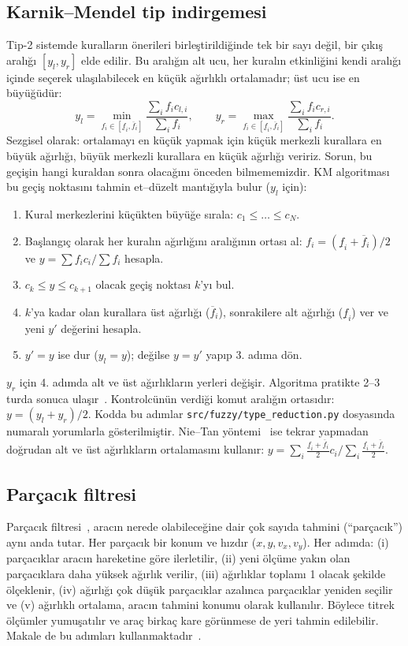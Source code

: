 \documentclass[conference,a4paper]{IEEEtran}
\begin{document}
\subsection{Karnik--Mendel tip indirgemesi}
Tip-2 sistemde kuralların önerileri birleştirildiğinde tek bir sayı değil, bir çıkış aralığı $[y_l, y_r]$ elde edilir. Bu aralığın alt ucu, her kuralın etkinliğini kendi aralığı içinde seçerek ulaşılabilecek en küçük ağırlıklı ortalamadır; üst ucu ise en büyüğüdür:
\begin{equation}
y_l=\min_{f_i\in[\underline{f}_i,\overline{f}_i]}\frac{\sum_i f_i c_{l,i}}{\sum_i f_i},\qquad
y_r=\max_{f_i\in[\underline{f}_i,\overline{f}_i]}\frac{\sum_i f_i c_{r,i}}{\sum_i f_i}.
\end{equation}
Sezgisel olarak: ortalamayı en küçük yapmak için küçük merkezli kurallara en büyük ağırlığı, büyük merkezli kurallara en küçük ağırlığı veririz. Sorun, bu geçişin hangi kuraldan sonra olacağını önceden bilmememizdir. KM algoritması~\cite{karnik2001} bu geçiş noktasını tahmin et--düzelt mantığıyla bulur ($y_l$ için):
\begin{enumerate}
\item Kural merkezlerini küçükten büyüğe sırala: $c_1\le\dots\le c_N$.
\item Başlangıç olarak her kuralın ağırlığını aralığının ortası al: $f_i=(\underline{f}_i+\overline{f}_i)/2$ ve $y=\sum f_i c_i/\sum f_i$ hesapla.
\item $c_k\le y\le c_{k+1}$ olacak geçiş noktası $k$'yı bul.
\item $k$'ya kadar olan kurallara üst ağırlığı ($\overline{f}_i$), sonrakilere alt ağırlığı ($\underline{f}_i$) ver ve yeni $y'$ değerini hesapla.
\item $y'=y$ ise dur ($y_l=y$); değilse $y=y'$ yapıp 3. adıma dön.
\end{enumerate}
$y_r$ için 4. adımda alt ve üst ağırlıkların yerleri değişir. Algoritma pratikte 2--3 turda sonuca ulaşır~\cite{karnik2001,wu2009}. Kontrolcünün verdiği komut aralığın ortasıdır: $y=(y_l+y_r)/2$. Kodda bu adımlar \texttt{src/fuzzy/type\_reduction.py} dosyasında numaralı yorumlarla gösterilmiştir. Nie--Tan yöntemi~\cite{nie2008} ise tekrar yapmadan doğrudan alt ve üst ağırlıkların ortalamasını kullanır: $y=\sum_i \tfrac{\underline{f}_i+\overline{f}_i}{2}c_i \big/ \sum_i \tfrac{\underline{f}_i+\overline{f}_i}{2}$.

\subsection{Parçacık filtresi}
Parçacık filtresi~\cite{gordon1993,arulampalam2002}, aracın nerede olabileceğine dair çok sayıda tahmini (``parçacık'') aynı anda tutar. Her parçacık bir konum ve hızdır ($x,y,v_x,v_y$). Her adımda: (i) parçacıklar aracın hareketine göre ilerletilir, (ii) yeni ölçüme yakın olan parçacıklara daha yüksek ağırlık verilir, (iii) ağırlıklar toplamı 1 olacak şekilde ölçeklenir, (iv) ağırlığı çok düşük parçacıklar azalınca parçacıklar yeniden seçilir ve (v) ağırlıklı ortalama, aracın tahmini konumu olarak kullanılır. Böylece titrek ölçümler yumuşatılır ve araç birkaç kare görünmese de yeri tahmin edilebilir. Makale de bu adımları kullanmaktadır~\cite{li2024}.
\end{document}
